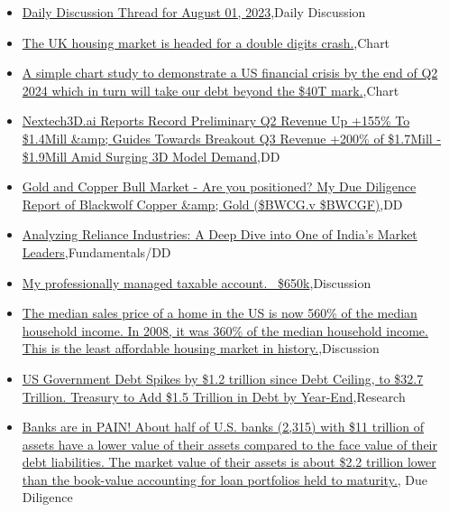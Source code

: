 \documentclass{article}%
\begin{document}
%
\begin{itemize}%
\item%
\href{https://reddit.com/r/wallstreetbets/comments/15f82iu/daily\_discussion\_thread\_for\_august\_01\_2023/}{Daily Discussion Thread for August 01, 2023},Daily Discussion%
\item%
\href{https://reddit.com/r/wallstreetbets/comments/15f6y3z/the\_uk\_housing\_market\_is\_headed\_for\_a\_double/}{The UK housing market is headed for a double digits crash.},Chart%
\item%
\href{https://reddit.com/r/wallstreetbets/comments/15f5czf/a\_simple\_chart\_study\_to\_demonstrate\_a\_us/}{A simple chart study to demonstrate a US financial crisis by the end of Q2 2024 which in turn will take our debt beyond the \$40T mark.},Chart%
\item%
\href{https://reddit.com/r/Baystreetbets/comments/15fbkyc/nextech3dai\_reports\_record\_preliminary\_q2\_revenue/}{Nextech3D.ai Reports Record Preliminary Q2 Revenue Up +155\% To \$1.4Mill \&amp; Guides Towards Breakout Q3 Revenue +200\% of \$1.7Mill - \$1.9Mill Amid Surging 3D Model Demand},DD%
\item%
\href{https://reddit.com/r/Baystreetbets/comments/15eka40/gold\_and\_copper\_bull\_market\_are\_you\_positioned\_my/}{Gold and Copper Bull Market - Are you positioned? My Due Diligence Report of Blackwolf Copper \&amp; Gold (\$BWCG.v \$BWCGF)},DD%
\item%
\href{https://reddit.com/r/StockMarket/comments/15f9kt7/analyzing\_reliance\_industries\_a\_deep\_dive\_into/}{Analyzing Reliance Industries: A Deep Dive into One of India's Market Leaders},Fundamentals/DD%
\item%
\href{https://reddit.com/r/StockMarket/comments/15f1f15/my\_professionally\_managed\_taxable\_account\_650k/}{My professionally managed taxable account. ~\$650k},Discussion%
\item%
\href{https://reddit.com/r/StockMarket/comments/15emafy/the\_median\_sales\_price\_of\_a\_home\_in\_the\_us\_is\_now/}{The median sales price of a home in the US is now 560\% of the median household income. In 2008, it was 360\% of the median household income. This is the least affordable housing market in history.},Discussion%
\item%
\href{https://reddit.com/r/Economics/comments/15f08t8/us\_government\_debt\_spikes\_by\_12\_trillion\_since/}{US Government Debt Spikes by \$1.2 trillion since Debt Ceiling, to \$32.7 Trillion. Treasury to Add \$1.5 Trillion in Debt by Year-End},Research%
\item%
\href{https://reddit.com/r/Superstonk/comments/15ez8xk/banks\_are\_in\_pain\_about\_half\_of\_us\_banks\_2315/}{Banks are in PAIN! About half of U.S. banks (2,315) with \$11 trillion of assets have a lower value of their assets compared to the face value of their debt liabilities. The market value of their assets is about \$2.2 trillion lower than the book-value accounting for loan portfolios held to maturity.}, Due Diligence%
\end{itemize}%
\end{document}
